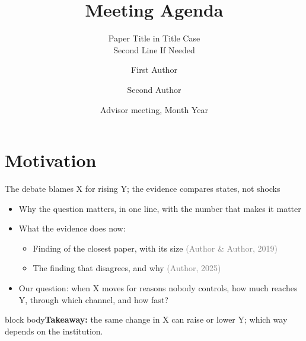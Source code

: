 \documentclass[aspectratio=169,10pt]{beamer}
\title{Meeting Agenda}
\subtitle{Paper Title in Title Case\\ Second Line If Needed}
\author{First Author \and Second Author}
\institute{University}
\date{Advisor meeting, Month Year}
\newcommand{\takeaway}[1]{\vfill\begin{beamercolorbox}[sep=5pt]{block body}\small\textbf{Takeaway:} #1\end{beamercolorbox}}
\newcommand{\citeg}[1]{\textcolor{gray}{(#1)}}
\begin{document}
\begin{frame}
\titlepage
\end{frame}

\section{Motivation}

\begin{frame}{The debate blames X for rising Y; the evidence compares states, not shocks}
\begin{itemize}
\item Why the question matters, in one line, with the number that makes it matter
\item What the evidence does now:
  \begin{itemize}
  \item Finding of the closest paper, with its size \citeg{Author \& Author, 2019}
  \item The finding that disagrees, and why \citeg{Author, 2025}
  \end{itemize}
\item Our question: when X moves for reasons nobody controls, how much reaches Y, through which channel, and how fast?
\end{itemize}
\takeaway{the same change in X can raise or lower Y; which way depends on the institution.}
\end{frame}
\end{document}
